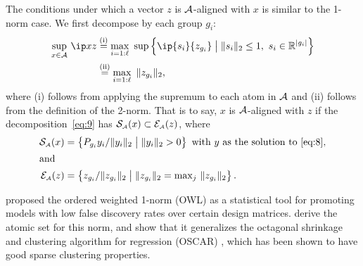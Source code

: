 \begin{example}
  The conditions under which a vector $z$ is $\mathcal{A}$-aligned with $x$
  is similar to the 1-norm case. We first decompose by each group
  $g_i$:
  \begin{align*}
    \sup_{x\in\Ascr}\,\ip x z
    &\overset{\rm(i)}=
    \max_{i=1:\ell}\ 
      \sup \left\{\ip{s_i}{z_{g_i}} \bigm| \norm{s_i}_2\le1,\ s_i\in\Re^{|g_i|}\right\}
    \\&\overset{\rm(ii)}=
      \max_{i=1:\ell}\ \norm{z_{g_i}}_2,
  \end{align*}
  where (i) follows from applying the supremum to each atom in $\mathcal{A}$ and (ii)
  follows from the definition of the 2-norm. That is to say, $x$ is
  $\mathcal{A}$-aligned with $z$ if the decomposition~\eqref{eq:9} has
  $\operatorname{\mathcal{S}_{\scriptscriptstyle\mathcal{A}}}(x)\subset\mathcal{E}_{\scriptscriptstyle\mathcal{A}}(z)$, where
  \begin{align*}
    \operatorname{\mathcal{S}_{\scriptscriptstyle\mathcal{A}}}(x) &= \left\{
      P_{g_i}y_{i}/\|y_{i}\|_2 \bigm| \|y_{i}\|_2>0
    \right\} \ \mbox{with $y$ as the solution to \eqref{eq:8}},
  \\\intertext{and} \mathcal{E}_{\scriptscriptstyle\mathcal{A}}(z) &= \left\{
      z_{g_i}/\|z_{g_i}\|_2
      \bigm|
      \|z_{g_i}\|_2 = \textstyle\max_j\,\|z_{g_i}\|_2
    \right\}.
  \end{align*}
  
\end{example}

\citet{bogdan2013statistical} proposed the ordered weighted 1-norm (OWL) as a
statistical tool for promoting models with low false discovery rates over
certain design matrices. \citet{zeng2014ordered} derive the atomic set for this
norm, and show that it generalizes the octagonal shrinkage and clustering
algorithm for regression (OSCAR) \cite{bondell2008simultaneous}, which has been
shown to have good sparse clustering properties. 

